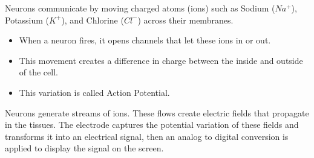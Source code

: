 \documentclass[10pt, letterpaper]{report}
\begin{document}
Neurons communicate by moving charged atoms (ions) such as Sodium ($Na^+$), Potassium ($K^+$), and Chlorine ($Cl^-$) across their membranes.
\begin{itemize}
    \item When a neuron fires, it opens channels that let these ions in or out.
    \item This movement creates a difference in charge between the inside and outside of the cell.
    \item This variation is called Action Potential.
\end{itemize}
Neurons generate streams of ions. These flows create electric fields that propagate in the tissues. The electrode captures the potential variation of these fields and transforms it into an electrical signal, then an analog to digital conversion is applied to display the signal on the screen.\bigskip
\end{document}
